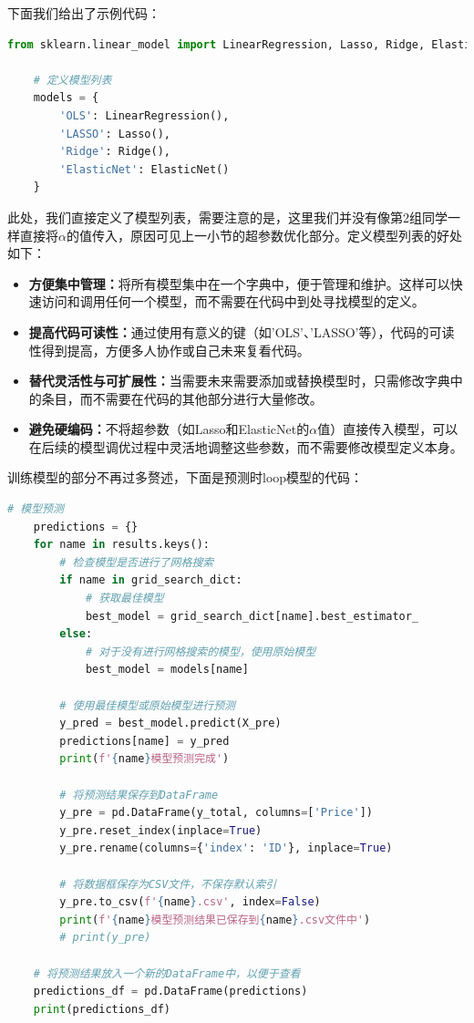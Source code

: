\documentclass[
    report,     %
    oneside,    %
    UTF8,       %
    zihao=-4    %
]{config} %
\begin{document}
下面我们给出了示例代码：

\begin{lstlisting}[label=code:model_defination, language=Python, caption=定义模型列表]
    from sklearn.linear_model import LinearRegression, Lasso, Ridge, ElasticNet

    # 定义模型列表
    models = {
        'OLS': LinearRegression(),
        'LASSO': Lasso(),
        'Ridge': Ridge(),
        'ElasticNet': ElasticNet()
    }
\end{lstlisting}

此处，我们直接定义了模型列表，需要注意的是，这里我们并没有像第2组同学一样直接将$\alpha$的值传入，原因可见上一小节的超参数优化部分。定义模型列表的好处如下：

\begin{itemize}
    \item \textbf{方便集中管理：}将所有模型集中在一个字典中，便于管理和维护。这样可以快速访问和调用任何一个模型，而不需要在代码中到处寻找模型的定义。
    \item \textbf{提高代码可读性：}通过使用有意义的键（如'OLS'、'LASSO'等），代码的可读性得到提高，方便多人协作或自己未来复看代码。
    \item \textbf{替代灵活性与可扩展性：}当需要未来需要添加或替换模型时，只需修改字典中的条目，而不需要在代码的其他部分进行大量修改。
    \item \textbf{避免硬编码：}不将超参数（如Lasso和ElasticNet的$\alpha$值）直接传入模型，可以在后续的模型调优过程中灵活地调整这些参数，而不需要修改模型定义本身。
\end{itemize}

训练模型的部分不再过多赘述，下面是预测时loop模型的代码：

\begin{lstlisting}[label=code:model_predict_loop, language=Python, caption=模型预测loop示例代码]
    # 模型预测
    predictions = {}
    for name in results.keys():
        # 检查模型是否进行了网格搜索
        if name in grid_search_dict:
            # 获取最佳模型
            best_model = grid_search_dict[name].best_estimator_
        else:
            # 对于没有进行网格搜索的模型，使用原始模型
            best_model = models[name]
        
        # 使用最佳模型或原始模型进行预测
        y_pred = best_model.predict(X_pre)
        predictions[name] = y_pred
        print(f'{name}模型预测完成')
        
        # 将预测结果保存到DataFrame
        y_pre = pd.DataFrame(y_total, columns=['Price'])
        y_pre.reset_index(inplace=True)
        y_pre.rename(columns={'index': 'ID'}, inplace=True)
        
        # 将数据框保存为CSV文件，不保存默认索引
        y_pre.to_csv(f'{name}.csv', index=False)
        print(f'{name}模型预测结果已保存到{name}.csv文件中')
        # print(y_pre)
    
    # 将预测结果放入一个新的DataFrame中，以便于查看
    predictions_df = pd.DataFrame(predictions)
    print(predictions_df)
\end{lstlisting}
\end{document}
